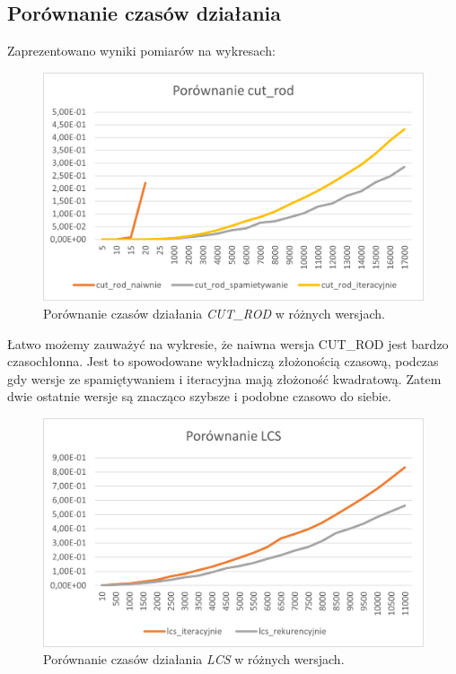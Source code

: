 \documentclass{article}
\begin{document}
	\subsection{Porównanie czasów działania}
	Zaprezentowano wyniki pomiarów na wykresach:
	
	\begin{figure}[H]
		\centering
		\includegraphics[width=\textwidth]{cut_rod.png}
		\caption{Porównanie czasów działania \textit{CUT\_ROD} w różnych wersjach.}
	\end{figure}
	 Łatwo możemy zauważyć na wykresie, że naiwna wersja CUT\_ROD jest bardzo czasochłonna. Jest to spowodowane wykładniczą złożonością czasową, podczas gdy wersje ze spamiętywaniem i iteracyjna mają złożoność kwadratową. Zatem dwie ostatnie wersje są znacząco szybsze i podobne czasowo do siebie.
	\begin{figure}[H]
		\centering
		\includegraphics[width=\textwidth]{lcs.png}
		\caption{Porównanie czasów działania \textit{LCS} w różnych wersjach.}
	\end{figure}
\end{document}
